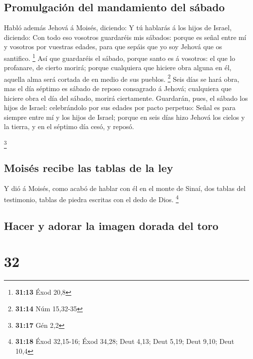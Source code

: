 \hypertarget{promulgaciuxf3n-del-mandamiento-del-suxe1bado}{%
\subsection{Promulgación del mandamiento del
sábado}\label{promulgaciuxf3n-del-mandamiento-del-suxe1bado}}

 Habló además Jehová á Moisés, diciendo:  Y tú
hablarás á los hijos de Israel, diciendo: Con todo eso vosotros
guardaréis mis sábados: porque es señal entre mí y vosotros por vuestras
edades, para que sepáis que yo soy Jehová que os santifico. \footnote{\textbf{31:13}
  Éxod 20,8}  Así que guardaréis el sábado, porque santo es
á vosotros: el que lo profanare, de cierto morirá; porque cualquiera que
hiciere obra alguna en él, aquella alma será cortada de en medio de sus
pueblos. \footnote{\textbf{31:14} Núm 15,32-35}  Seis días
se hará obra, mas el día séptimo es sábado de reposo consagrado á
Jehová; cualquiera que hiciere obra el día del sábado, morirá
ciertamente.  Guardarán, pues, el sábado los hijos de
Israel: celebrándolo por sus edades por pacto perpetuo: 
Señal es para siempre entre mí y los hijos de Israel; porque en seis
días hizo Jehová los cielos y la tierra, y en el séptimo día cesó, y
reposó.

\footnote{\textbf{31:17} Gén 2,2}

\hypertarget{moisuxe9s-recibe-las-tablas-de-la-ley}{%
\subsection{Moisés recibe las tablas de la
ley}\label{moisuxe9s-recibe-las-tablas-de-la-ley}}

 Y dió á Moisés, como acabó de hablar con él en el monte de
Sinaí, dos tablas del testimonio, tablas de piedra escritas con el dedo
de Dios. \footnote{\textbf{31:18} Éxod 32,15-16; Éxod 34,28; Deut 4,13;
  Deut 5,19; Deut 9,10; Deut 10,4}

\hypertarget{hacer-y-adorar-la-imagen-dorada-del-toro}{%
\subsection{Hacer y adorar la imagen dorada del
toro}\label{hacer-y-adorar-la-imagen-dorada-del-toro}}

\hypertarget{section-31}{%
\section{32}\label{section-31}}

